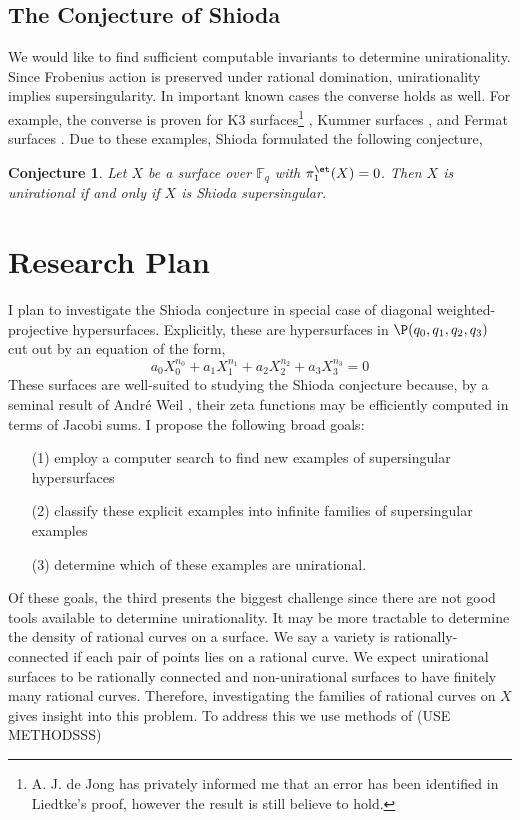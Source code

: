 \documentclass[10pt]{amsart}
\newtheorem*{conj}{Conjecture}
\begin{document}
\subsection*{The Conjecture of Shioda}

We would like to find sufficient computable invariants to determine unirationality. Since Frobenius action is preserved under rational domination, unirationality implies supersingularity. In important known cases the converse holds as well. For example, the converse is proven for K3 surfaces\footnote{A. J. de Jong has privately informed me that an error has been identified in Liedtke's proof, however the result is still believe to hold.} \cite{liedtke}, Kummer surfaces \cite{shioda_some_results},  and Fermat surfaces \cite{shioda_on_fermat}. Due to these examples, Shioda formulated \cite{shioda_some_results} the following conjecture,
\begin{conj}
Let $X$ be a surface over $\mathbb{F}_q$ with $\pi_1^{\et}(X) = 0$. Then $X$ is unirational if and only if $X$ is Shioda supersingular.
\end{conj}

\section*{Research Plan}

I plan to investigate the Shioda conjecture in special case of diagonal weighted-projective hypersurfaces. Explicitly, these are hypersurfaces in $\P(q_0, q_1, q_2, q_3)$ cut out by an equation of the form,
\[ a_0 X_0^{n_0} + a_1 X_1^{n_1} + a_2 X_2^{n_2} + a_3 X_3^{n_3} = 0 \]
These surfaces are well-suited to studying the Shioda conjecture because, by a seminal result of Andr\'{e} Weil \cite{weil_counting}, their zeta functions may be efficiently computed in terms of Jacobi sums. I propose the following broad goals:
\begin{enumerate}
\item[(1)] employ a computer search to find new examples of supersingular hypersurfaces
\item[(2)] classify these explicit examples into infinite families of supersingular examples
\item[(3)] determine which of these examples are unirational.
\end{enumerate}
Of these goals, the third presents the biggest challenge since there are not good tools available to determine unirationality. It may be more tractable to determine the density of rational curves on a surface. We say a variety is rationally-connected if each pair of points lies on a rational curve. We expect unirational surfaces to be rationally connected and non-unirational surfaces to have finitely many rational curves. Therefore, investigating the families of rational curves on $X$ gives insight into this problem. To address this we use methods of (USE METHODSSS)
\end{document}
